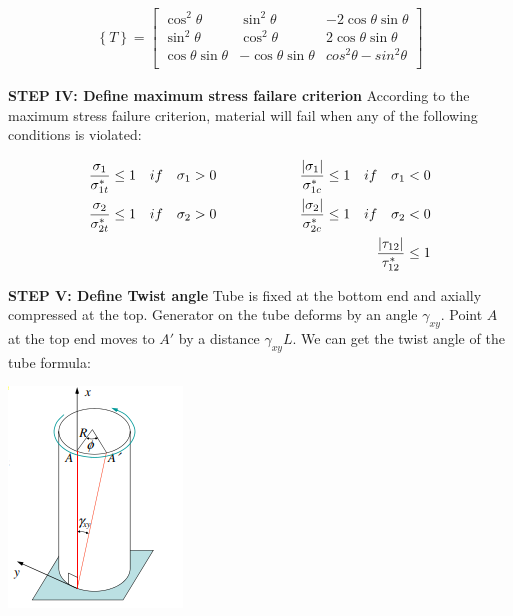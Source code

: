 \documentclass[12pt]{article}
\begin{document}
	\begin{center}
		\begin{equation}
			\begin{align}
				\left\{ T \right\} = \left[\begin{matrix}
			\cos^2{\theta} & \sin^2{\theta} & -2\cos{\theta}\sin{\theta} \\
			\sin^2{\theta} & \cos^2{\theta} & 2\cos{\theta}\sin{\theta} \\
			\cos{\theta}\sin{\theta} & -\cos{\theta}\sin{\theta} & cos^2{\theta}-sin^2{\theta} \\
			\end{matrix} \right]
		\end{align}
	\end{equation}
\end{center}\newline
\noindent \textbf{STEP IV: Define maximum stress failare criterion}\newline
\noindent According to the maximum stress failure criterion, material will fail when any of the following conditions is violated:
\begin{center}
	\begin{equation}
		\begin{align}
\frac{\sigma_1}{\sigma^*_{1t}} \leq 1 \quad if \quad \sigma_1 > 0 \qquad\qquad\qquad \frac{\left| \sigma_1 \right|}{\sigma^*_{1c}} \leq 1 \quad if \quad  \sigma_1 < 0 \\
\frac{\sigma_2}{\sigma^*_{2t}} \leq 1 \quad if \quad \sigma_2 > 0 \qquad\qquad\qquad \frac{\left| \sigma_2 \right|}{\sigma^*_{2c}} \leq 1 \quad if \quad  \sigma_2 < 0\\
\frac{\left| \tau_{12} \right|}{\tau^*_{12}} \leq 1\hfill\\
\end{align}
\end{equation}
\end{center}\newline
\noindent \textbf{STEP V: Define Twist angle}\newline
\noindent Tube is fixed at the bottom end and axially compressed at the top. Generator on the tube deforms by an angle $\gamma_{xy}$.
Point $A$ at the top end moves to $A'$ by a distance $\gamma_{xy}L$.
We can get the twist angle of the tube formula:\newline
\begin{center}
	\includegraphics{twist.png}\newline
\end{center}
\end{document}
